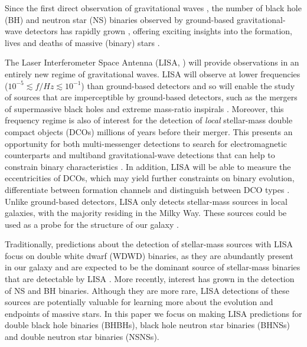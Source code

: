 Since the first direct observation of gravitational waves \citep{Abbott+2016_first_detection}, the number of black hole (BH) and neutron star (NS) binaries observed by ground-based gravitational-wave detectors has rapidly grown \citep{Abbott+2019_GWTC1,Abbott+2020_GWTC2}, offering exciting insights into the formation, lives and deaths of massive (binary) stars \citep[e.g.][]{Abbott+2021_GWTC2_inference}.

The Laser Interferometer Space Antenna (LISA, \citealp{Amaro-Seoane+2017, Colpi+2019}) will provide observations in an entirely new regime of gravitational waves. LISA will observe at lower frequencies ($10^{-5} \lesssim f / \unit{Hz} \lesssim 10^{-1}$) than ground-based detectors and so will enable the study of sources that are imperceptible by ground-based detectors, such as the mergers of supermassive black holes and extreme mass-ratio inspirals \citep[e.g.][]{Begelman+1980, Klein+2016}. Moreover, this frequency regime is also of interest for the detection of \textit{local} stellar-mass double compact objects (DCOs) millions of years before their merger. This presents an opportunity for both multi-messenger detections to search for electromagnetic counterparts and multiband gravitational-wave detections that can help to constrain binary characteristics \citep[e.g.][]{Sesana+2016, Gerosa+2019}. In addition, LISA will be able to measure the eccentricities of DCOs, which may yield further constraints on binary evolution, differentiate between formation channels and distinguish between DCO types \citep[e.g.][]{Nelemans+2001, Breivik+2016, Antonini+2017, Rodriguez+2018}. Unlike ground-based detectors, LISA only detects stellar-mass sources in local galaxies, with the majority residing in the Milky Way. These sources could be used as a probe for the structure of our galaxy \citep[e.g.][]{Korol+2019}.

Traditionally, predictions about the detection of stellar-mass sources with LISA focus on double white dwarf (WDWD) binaries, as they are abundantly present in our galaxy and are expected to be the dominant source of stellar-mass binaries that are detectable by LISA \citep{Nelemans+2001,Ruiter+2010,Yu+2010,Nissanke+2012,Korol+2017,Lamberts+2018}. More recently, interest has grown in the detection of NS and BH binaries. Although they are more rare, LISA detections of these sources are potentially valuable for learning more about the evolution and endpoints of massive stars. In this paper we focus on making LISA predictions for double black hole binaries (BHBHs), black hole neutron star binaries (BHNSs) and double neutron star binaries (NSNSs).

